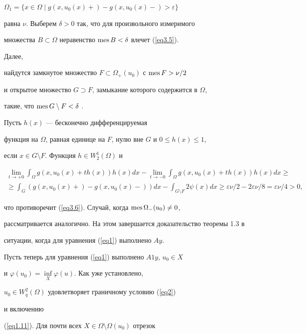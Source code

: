 $\Omega_1=\{x \in \Omega \mid g(x,u_0(x)+)-g(x,u_0(x)-)>\varepsilon\}$


равна $\nu$. Выберем $\delta>0$ так, что для произвольного измеримого


множества $B\subset\Omega$ неравенство $\operatorname{mes} B <\delta$ влечет (\ref{eq3.5}).


Далее,


найдутся замкнутое множество $F\subset\Omega_{+}(u_0)$ с $\operatorname{mes} F>\nu/2$


и открытое множество $G\supset F$, замыкание которого содержится в $\Omega$,


такие, что $\operatorname{mes} G \setminus F<\delta$ \cite{n14}.


Пусть $h(x)$ --- бесконечно дифференцируемая


функция на $\Omega$, равная единице на $F$, нулю вне $G$ и $0 \le h(x) \le 1$,


если $x \in G \setminus F$. Функция $h \in W_2^1(\Omega)$ и


\begin{multline*}


\lim\limits_{t \to +0} \int_\Omega g(x,u_0(x)+th(x)) h(x) dx-


\lim\limits_{t \to -0} \int_\Omega g(x,u_0(x)+th(x)) h(x) dx \ge \\


%


\ge \int_G (g(x,u_0(x)+)-g(x,u_0(x)-)) dx-


\int_{G \setminus F} 2\psi(x) dx


\ge \varepsilon\nu/2-2\varepsilon\nu/8 = \varepsilon\nu/4>0,


\end{multline*}


что противоречит (\ref{eq3.6}). Случай, когда $\operatorname{mes}\Omega_{-}(u_0)\ne 0$,


рассматривается аналогично. На этом завершается доказательство теоремы 1.3 в


ситуации, когда для уравнения (\ref{eq1}) выполнено $Ay$.





Пусть теперь для уравнения (\ref{eq1}) выполнено $A1y$, $u_0 \in X$


и $\varphi(u_0)=\inf\limits_X\varphi(u)$. Как уже установлено,


$u_0 \in W_q^2(\Omega)$ удовлетворяет граничному условию (\ref{eq2})


и включению


(\ref{eq1.11}). Для почти всех $X \in\Omega \setminus \Omega(u_0)$ отрезок


